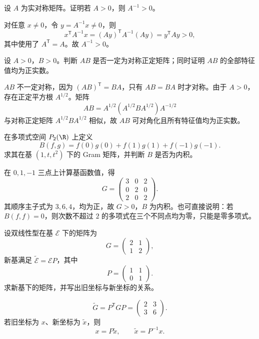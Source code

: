 \begin{exercise}[level=standard]
设 $A$ 为实对称矩阵。证明若 $A>0$，则 $A^{-1}>0$。
\begin{solution}
对任意 $x\ne0$，令 $y=A^{-1}x\ne0$，则
\[
x^{\mathsf T}A^{-1}x=(Ay)^{\mathsf T}A^{-1}(Ay)=y^{\mathsf T}Ay>0,
\]
其中使用了 $A^{\mathsf T}=A$。故 $A^{-1}>0$。
\end{solution}
\end{exercise}

\begin{exercise}[level=standard]
设 $A>0$，$B>0$。判断 $AB$ 是否一定为对称正定矩阵；同时证明 $AB$ 的全部特征值均为正实数。
\begin{solution}
$AB$ 不一定对称，因为 $(AB)^{\mathsf T}=BA$，只有 $AB=BA$ 时才对称。由于 $A>0$，存在正定平方根 $A^{1/2}$。矩阵
\[
AB=A^{1/2}(A^{1/2}BA^{1/2})A^{-1/2}
\]
与对称正定矩阵 $A^{1/2}BA^{1/2}$ 相似，故 $AB$ 可对角化且所有特征值均为正实数。
\end{solution}
\end{exercise}

\begin{exercise}[level=standard]
在多项式空间 $P_2(\R)$ 上定义
\[
B(f,g)=f(0)g(0)+f(1)g(1)+f(-1)g(-1).
\]
求其在基 $(1,t,t^2)$ 下的 Gram 矩阵，并判断 $B$ 是否为内积。
\begin{solution}
在 $0,1,-1$ 三点上计算基函数值，得
\[
G=\begin{pmatrix}
3&0&2\\
0&2&0\\
2&0&2
\end{pmatrix}.
\]
其顺序主子式为 $3,6,4$，均为正，故 $G>0$，$B$ 为内积。也可直接说明：若 $B(f,f)=0$，则次数不超过 $2$ 的多项式在三个不同点均为零，只能是零多项式。
\end{solution}
\end{exercise}

\begin{exercise}[level=standard]
设双线性型在基 $\mathcal E$ 下的矩阵为
\[
G=\begin{pmatrix}2&1\\1&2\end{pmatrix},
\]
新基满足 $\widetilde{\mathcal E}=\mathcal E P$，其中
\[
P=\begin{pmatrix}1&1\\0&1\end{pmatrix}.
\]
求新基下的矩阵，并写出旧坐标与新坐标的关系。
\begin{solution}
\[
\widetilde G=P^{\mathsf T}GP
=\begin{pmatrix}2&3\\3&6\end{pmatrix}.
\]
若旧坐标为 $x$、新坐标为 $\widetilde x$，则
\[
x=P\widetilde x,\qquad \widetilde x=P^{-1}x.
\]
\end{solution}
\end{exercise}

